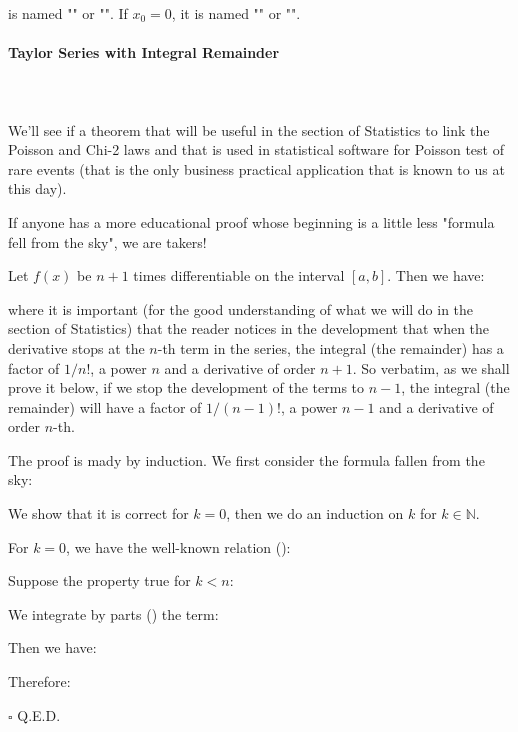 	is named "" or "". If $x_0=0$, it is named "" or "".
	
	\paragraph{Taylor Series with Integral Remainder}\mbox{}\\\\
	We'll see if a theorem that will be useful in the section of Statistics to link the Poisson and Chi-2 laws and that is used in statistical software for Poisson test of rare events (that is the only business practical application that is known to us at this day).
	\begin{tcolorbox}[title=Remark,colframe=black,arc=10pt]
	If anyone has a more educational proof whose beginning is a little less "formula fell from the sky", we are takers!
	\end{tcolorbox}
	\begin{theorem}
	Let $f(x)$ be $n + 1$ times differentiable on the interval $[a, b]$. Then we have:
	
	where it is important (for the good understanding of what we will do in the section of Statistics) that the reader notices in the development that when the derivative stops at the $n$-th term in the series, the integral (the remainder) has a factor of $1 / n !$, a power $n$ and a derivative of order $n + 1$. So verbatim, as we shall prove it below, if we stop the development of the terms to $n-1$, the integral (the remainder) will have a factor of $1 / (n-1) !$, a power $n-1$ and a derivative of order $n$-th.
	\end{theorem}
	\begin{dem}
	The proof is mady by induction. We first consider the formula fallen from the sky:
	
	We show that it is correct for $k = 0$, then we do an induction on $k$ for $k\in \mathbb{N}$.
	
	For $k = 0$, we have the well-known relation ():
	
	Suppose the property true for $k<n$:
	
	We integrate by parts () the term:
	
	Then we have:
	
	Therefore:
	
	\begin{flushright}
		$\square$  Q.E.D.
	\end{flushright}
	\end{dem}
	
